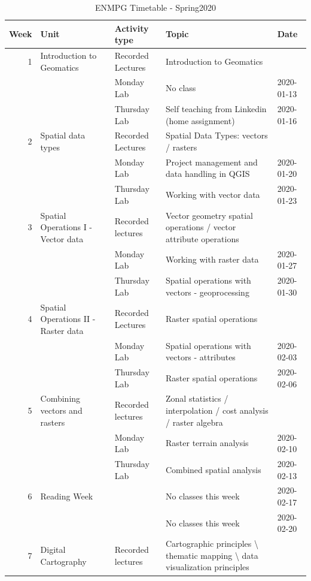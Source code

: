 \documentclass[
]{book}
\begin{document}
\begin{table}

\caption{\label{tab:timetable}ENMPG Timetable - Spring2020}
\centering
\begin{tabular}[t]{r|l|l|l|l}
\hline
Week & Unit & Activity type & Topic & Date\\
\hline
1 & Introduction to Geomatics & Recorded Lectures & Introduction to Geomatics & \\
\hline
 &  & Monday Lab & No class & 2020-01-13\\
\hline
 &  & Thursday Lab & Self teaching from Linkedin (home assignment) & 2020-01-16\\
\hline
2 & Spatial data types & Recorded Lectures & Spatial Data Types: vectors / rasters & \\
\hline
 &  & Monday Lab & Project management and data handling in QGIS & 2020-01-20\\
\hline
 &  & Thursday Lab & Working with vector data & 2020-01-23\\
\hline
3 & Spatial Operations I -  Vector data & Recorded lectures & Vector geometry spatial operations / vector attribute operations & \\
\hline
 &  & Monday Lab & Working with raster data & 2020-01-27\\
\hline
 &  & Thursday Lab & Spatial operations with vectors - geoprocessing & 2020-01-30\\
\hline
4 & Spatial Operations II - Raster data & Recorded Lectures & Raster spatial operations & \\
\hline
 &  & Monday Lab & Spatial operations with vectors - attributes & 2020-02-03\\
\hline
 &  & Thursday Lab & Raster spatial operations & 2020-02-06\\
\hline
5 & Combining vectors and rasters & Recorded lectures & Zonal statistics / interpolation / cost analysis / raster algebra & \\
\hline
 &  & Monday Lab & Raster terrain analysis & 2020-02-10\\
\hline
 &  & Thursday Lab & Combined spatial analysis & 2020-02-13\\
\hline
6 & Reading Week &  & No classes this week & 2020-02-17\\
\hline
 &  &  & No classes this week & 2020-02-20\\
\hline
7 & Digital Cartography & Recorded lectures & Cartographic principles \textbackslash{} thematic mapping \textbackslash{} data visualization principles & \\

\end{tabular}
\end{table}
\end{document}
